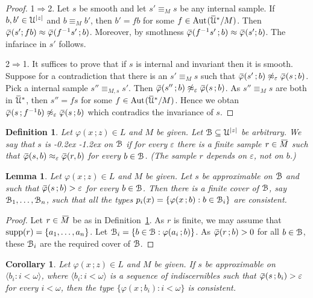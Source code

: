 \documentclass[10pt,openany]{article}
\def\supp{\mathop{\rm supp}}
\def\Aut{\textrm{Aut\kern.15ex}}
\newcommand{\sbar}[1]{\mkern 3mu\overline{\mkern-3mu#1\mkern-1mu}\mkern 1mu}
\newcommand{\barM}{\mkern 4mu\overline{\mkern-4mu M\mkern-2mu}\mkern 2mu}
\newcommand{\barU}{\mkern 2mu\overline{\mkern-2mu\U\mkern-2mu}\mkern 2mu}
\def\IMP{\Rightarrow}
\def\U{\EuScript U}
\def\B{\EuScript B}
\def\<{\langle}
\def\>{\rangle}
\def\phi{\varphi}
\def\epsilon{\varepsilon}
\def\ssf#1{\textsf{\small #1}}
\newcounter{thm}[section]
\theoremstyle{mio}
\newtheorem{corollary}[thm]{Corollary}
\newtheorem{lemma}[thm]{Lemma}
\newtheorem{definition}[thm]{Definition}
\theoremstyle{liscio}
\def\QED{\noindent\nolinebreak[4]\hspace{\stretch{1}}\rlap{\ \ $\Box$}\medskip}
\renewcommand*{\emph}[1]{%
   \kern-0.2ex 
   \smash{\tikz[baseline]
   \node[ rectangle, fill=emphcolor, rounded corners, 
          inner xsep=.3ex, inner ysep=.2ex, anchor=base,
          minimum height = 3ex
         ]{#1};
   }
   \kern-1.2ex 
}
\begin{document}
\begin{proof}
  \ssf{1}$\IMP$\ssf{2}.
  Let $s$ be smooth and let $s'\equiv_Ms$ be any internal sample.
  If $b,b'\in\U^{|z|}$ and $b\equiv_Mb'$, then $b'=fb$ for some $f\in\Aut(\barU^*/M)$.
  Then $\sbar\phi(s';fb)\approx\sbar\phi(f^{-1}s'\,;b)$.
  Moreover, by smothness $\sbar\phi(f^{-1}s'\,;b)\approx\sbar\phi(s';b)$. The infariace in $s'$ follows.

  \ssf{2}$\IMP$\ssf{1}.
  It suffices to prove that if $s$ is internal and invariant then it is smooth.
  Suppose for a contradiction that there is an $s'\equiv_Ms$ such that $\sbar\phi(s'\,;b)\not\approx_\epsilon\sbar\phi(s\,;b)$.
  Pick a internal sample $s''\equiv_{M,s}s'$.
  Then $\sbar\phi(s''\,;b)\not\approx_\epsilon\sbar\phi(s\,;b)$.
  As $s''\equiv_Ms$ are both in $\barU^*$, then $s''=fs$ for some $f\in\Aut(\barU^*/M)$.
  Hence we obtan $\sbar\phi(s\,;f^{-1}b)\not\approx_\epsilon\sbar\phi(s\,;b)$ which contradics the invariance of $s$.
\end{proof}


\begin{definition}\label{def_approximable_sample}
  Let $\phi(x\,;z)\in L$ and $M$ be given.
  Let $\B\subseteq\U^{|z|}$ be arbitrary.
  We say that $s$ is \emph{(uniformly) approximable\/} on $\B$ if for every $\epsilon$ there is a finite sample $r\in \barM$ such that $\sbar\phi(s,b)\approx_\epsilon\sbar\phi(r,b)$ for every $b\in\B$. (The sample $r$ depends on $\epsilon$, not on $b$.)\QED
\end{definition}

\begin{lemma}\label{lem_cons}
  Let $\phi(x\,;z)\in L$ and $M$ be given.
  Let $s$ be approximable on $\B$ and such that $\sbar\phi(s\,;b)>\epsilon$ for every $b\in\B$. Then there is a finite cover of $\B$, say $\B_1,\dots,\B_n$, such that all the types $p_i(x)=\{\phi(x\,;b):b\in\B_i\}$ are consistent.
\end{lemma}

\begin{proof}
  Let $r\in \barM$ be as in Definition~\ref{def_approximable_sample}.
  As $r$ is finite, we may assume that $\supp(r)=\{a_1,\dots,a_n\}$.
  Let $\B_i=\{b\in\B:\phi(a_i\,;b)\}$.
  As $\sbar\phi(r\,;b)>0$ for all $b\in\B$, these $\B_i$ are the required cover of $\B$.
\end{proof}

\begin{corollary}
  Let $\phi(x\,;z)\in L$ and $M$ be given.
  If $s$ be approximable on $\<b_i:i<\omega\>$, where $\<b_i:i<\omega\>$ is a sequence of indiscernibles such that $\sbar\phi(s\,;b_i)>\epsilon$ for every $i<\omega$, then the type $\{\phi(x\,;b_i):i<\omega\}$ is consistent.\QED
\end{corollary}
\end{document}
